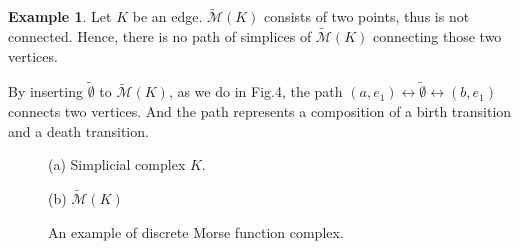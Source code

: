 \documentclass[a4paper,12pt,notitlepage]{amsart}
\theoremstyle{definition}%
\newtheorem{example}[theorem]{Example}
\theoremstyle{definition}%
\theoremstyle{definition}%
\newcommand{\es}{\tilde{\emptyset}}
\newcommand{\MMK}{\widetilde{\mathcal{M}} (K)}
\begin{document}
\begin{example}
Let $K$ be an edge.
$\MMK$ consists of two points, thus is not connected.
Hence,
there is no path of simplices of $\MMK$
connecting those two vertices.


By inserting $\es$
to $\MMK$, as we do in Fig.4,
the path
$(a,e_1) \leftrightarrow \es \leftrightarrow (b,e_1)$
connects two vertices.
And the path represents 
a composition of a birth transition 
and a death transition.


\begin{figure}[h]


\begin{minipage}{.5\textwidth}



(a) Simplicial complex  $K$.
\end{minipage}%
\begin{minipage}{.5\textwidth}

\centering
{}

(b)   $\MMK$
\end{minipage}


\caption{An example of discrete Morse function complex.}
\label{complex example}
\end{figure}



\end{example}
\end{document}
